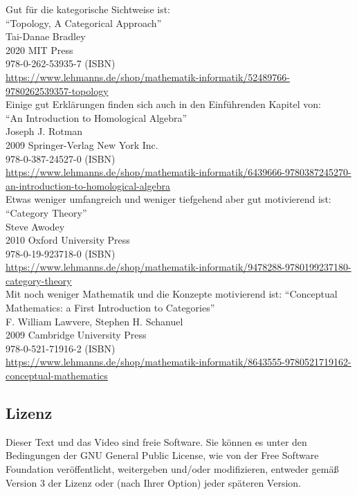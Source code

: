 \documentclass[a4paper]{amsart}
\theoremstyle{definition}
\begin{document}
Gut für die kategorische Sichtweise ist:\\
"`Topology, A Categorical Approach"'\\
Tai-Danae Bradley\\
2020 MIT Press\\
978-0-262-53935-7 (ISBN)\\ 
{\tiny
\url{https://www.lehmanns.de/shop/mathematik-informatik/52489766-9780262539357-topology}}\\

Einige gut Erklärungen finden sich auch in den Einführenden Kapitel von:\\
"`An Introduction to Homological Algebra"'\\
Joseph J. Rotman\\
2009 Springer-Verlag New York Inc.\\
978-0-387-24527-0 (ISBN)\\ 
{\tiny \url{https://www.lehmanns.de/shop/mathematik-informatik/6439666-9780387245270-an-introduction-to-homological-algebra}}\\

Etwas weniger umfangreich und weniger tiefgehend aber gut motivierend ist:
"`Category Theory"'\\
Steve Awodey\\
2010 Oxford University Press\\
978-0-19-923718-0 (ISBN)\\
{\tiny\url{https://www.lehmanns.de/shop/mathematik-informatik/9478288-9780199237180-category-theory}}\\

Mit noch weniger Mathematik und die Konzepte motivierend ist:
"`Conceptual Mathematics: a First Introduction to Categories"'\\
F. William Lawvere, Stephen H. Schanuel\\
2009 Cambridge University Press\\
978-0-521-71916-2 (ISBN)\\
{\tiny\url{https://www.lehmanns.de/shop/mathematik-informatik/8643555-9780521719162-conceptual-mathematics}}

\subsection*{Lizenz}
Dieser Text und das Video sind freie Software. Sie können es unter den Bedingungen der 
GNU General Public License, wie von der Free Software Foundation veröffentlicht, weitergeben 
und/oder modifizieren, entweder gemäß Version 3 der Lizenz oder (nach Ihrer Option) jeder späteren Version.
\end{document}
